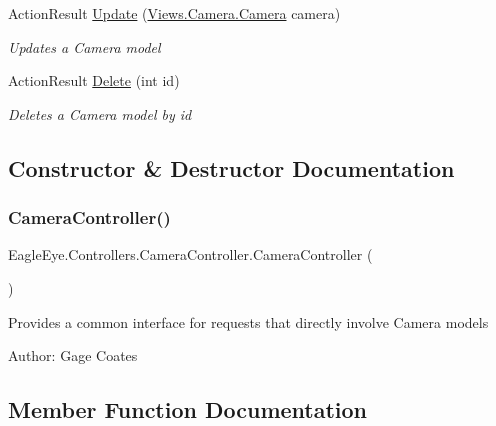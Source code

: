 \begin{DoxyCompactItemize}
Action\+Result \mbox{\hyperlink{class_eagle_eye_1_1_controllers_1_1_camera_controller_a9e43f7e6f051aa5dbc695d68b4b013ab}{Update}} (\mbox{\hyperlink{class_eagle_eye_1_1_views_1_1_camera_1_1_camera}{Views.\+Camera.\+Camera}} camera)
\begin{DoxyCompactList}\small\item\em Updates a Camera model \end{DoxyCompactList}\item 
Action\+Result \mbox{\hyperlink{class_eagle_eye_1_1_controllers_1_1_camera_controller_ade4d5c697769c79b1866f95bbf7fc889}{Delete}} (int id)
\begin{DoxyCompactList}\small\item\em Deletes a Camera model by id \end{DoxyCompactList}\end{DoxyCompactItemize}


\subsection{Constructor \& Destructor Documentation}
\mbox{\label{class_eagle_eye_1_1_controllers_1_1_camera_controller_a6b73ce65988171c22a039de9de4ac2c0}} 
\subsubsection{\texorpdfstring{CameraController()}{CameraController()}}
{\footnotesize\ttfamily Eagle\+Eye.\+Controllers.\+Camera\+Controller.\+Camera\+Controller (\begin{DoxyParamCaption}{ }\end{DoxyParamCaption})}



Provides a common interface for requests that directly involve Camera models 

Author\+: Gage Coates

\subsection{Member Function Documentation}
\mbox{\label{class_eagle_eye_1_1_controllers_1_1_camera_controller_a22c71acb769ab89d66c816e8af2dd55e}} 

